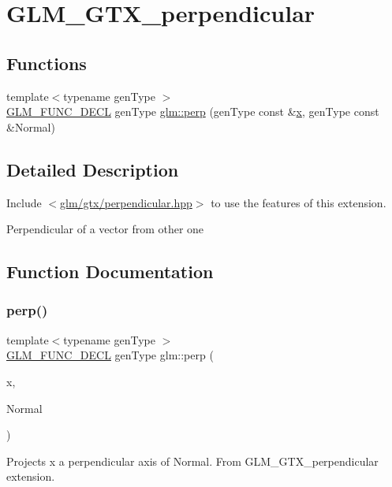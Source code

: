 \hypertarget{group__gtx__perpendicular}{}\section{G\+L\+M\+\_\+\+G\+T\+X\+\_\+perpendicular}
\label{group__gtx__perpendicular}
\subsection*{Functions}
\begin{DoxyCompactItemize}
\item 
{\footnotesize template$<$typename gen\+Type $>$ }\\\mbox{\hyperlink{setup_8hpp_ab2d052de21a70539923e9bcbf6e83a51}{G\+L\+M\+\_\+\+F\+U\+N\+C\+\_\+\+D\+E\+CL}} gen\+Type \mbox{\hyperlink{group__gtx__perpendicular_ga264cfc4e180cf9b852e943b35089003c}{glm\+::perp}} (gen\+Type const \&\mbox{\hyperlink{_s_d_l__opengl_8h_ad0e63d0edcdbd3d79554076bf309fd47}{x}}, gen\+Type const \&Normal)
\end{DoxyCompactItemize}


\subsection{Detailed Description}
Include $<$\mbox{\hyperlink{perpendicular_8hpp}{glm/gtx/perpendicular.\+hpp}}$>$ to use the features of this extension.

Perpendicular of a vector from other one 

\subsection{Function Documentation}
\mbox{\label{group__gtx__perpendicular_ga264cfc4e180cf9b852e943b35089003c}} 
\subsubsection{\texorpdfstring{perp()}{perp()}}
{\footnotesize\ttfamily template$<$typename gen\+Type $>$ \\
\mbox{\hyperlink{setup_8hpp_ab2d052de21a70539923e9bcbf6e83a51}{G\+L\+M\+\_\+\+F\+U\+N\+C\+\_\+\+D\+E\+CL}} gen\+Type glm\+::perp (\begin{DoxyParamCaption}\item[{gen\+Type const \&}]{x,  }\item[{gen\+Type const \&}]{Normal }\end{DoxyParamCaption})}

Projects x a perpendicular axis of Normal. From G\+L\+M\+\_\+\+G\+T\+X\+\_\+perpendicular extension. 